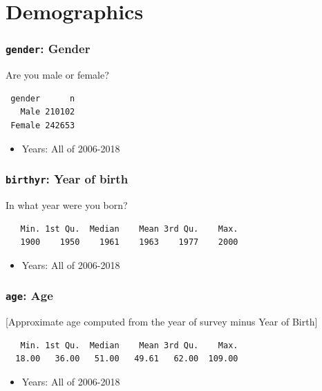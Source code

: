 \documentclass[10pt,article,oneside]{memoir}
\theoremstyle{definition}
\begin{document}
\section{Demographics}\label{demographics}

\subsubsection{\texorpdfstring{\texttt{gender}:
Gender}{gender: Gender}}\label{gender-gender}

Are you male or female?

\begin{verbatim}
 gender      n
   Male 210102
 Female 242653
\end{verbatim}

\begin{itemize}
\tightlist
\item
  Years: All of 2006-2018
\end{itemize}

\subsubsection{\texorpdfstring{\texttt{birthyr}: Year of
birth}{birthyr: Year of birth}}\label{birthyr-year-of-birth}

In what year were you born?

\begin{verbatim}
   Min. 1st Qu.  Median    Mean 3rd Qu.    Max. 
   1900    1950    1961    1963    1977    2000 
\end{verbatim}

\begin{itemize}
\tightlist
\item
  Years: All of 2006-2018
\end{itemize}

\subsubsection{\texorpdfstring{\texttt{age}:
Age}{age: Age}}\label{age-age}

{[}Approximate age computed from the year of survey minus Year of
Birth{]}

\begin{verbatim}
   Min. 1st Qu.  Median    Mean 3rd Qu.    Max. 
  18.00   36.00   51.00   49.61   62.00  109.00 
\end{verbatim}

\begin{itemize}
\tightlist
\item
  Years: All of 2006-2018
\end{itemize}
\end{document}
